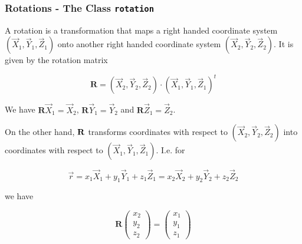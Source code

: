 \begin{frame}[fragile]
  \frametitle{Rotations - The \MTEX Class \texttt{\bf rotation}}

  A rotation is a transformation that maps a right handed coordinate system
  $(\vec X_{1}, \vec Y_{1}, \vec Z_{1})$ onto another right handed coordinate
  system $(\vec X_{2}, \vec Y_{2}, \vec Z_{2})$. It is given by the rotation
  matrix

  \begin{equation*}
    \mathbf R = (\vec X_{2}, \vec Y_{2}, \vec Z_{2}) \cdot (\vec X_{1}, \vec Y_{1}, \vec Z_{1})^{t}
  \end{equation*}

  \medskip

  We have $\mathbf R \vec X_{1} = \vec X_{2}$, $\mathbf R \vec Y_{1} = \vec
  Y_{2}$ and $\mathbf R \vec Z_{1} = \vec Z_{2}$.

  \medskip
  \pause

  On the other hand, $\bf R$ transforms coordinates with respect to $(\vec
  X_{2}, \vec Y_{2}, \vec Z_{2})$ into coordinates with respect to $(\vec
  X_{1}, \vec Y_{1}, \vec Z_{1})$. I.e. for

  \begin{equation*}
    \vec r
    = x_{1} \vec X_{1} + y_{1} \vec Y_{1} + z_{1} \vec Z_{1}
    = x_{2} \vec X_{2} + y_{2} \vec Y_{2} + z_{2} \vec Z_{2}
  \end{equation*}

  we have

  \begin{equation*}
    \mathbf R
    \left(
      \begin{matrix}
        x_{2}\\
        y_{2}\\
        z_{2}
      \end{matrix}\right)
    = \left(
      \begin{matrix}
        x_{1}\\
        y_{1}\\
        z_{1}
      \end{matrix}\right)
  \end{equation*}

\end{frame}



